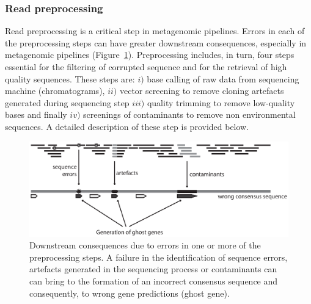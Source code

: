 \subsubsection{Read preprocessing}
Read preprocessing is a critical step in metagenomic pipelines. Errors in each of the preprocessing steps can have greater downstream consequences, especially in metagenomic pipelines (Figure~\ref{fig:errors}). Preprocessing includes, in turn, four steps essential for the filtering of corrupted sequence and for the retrieval of high quality sequences. These steps are: $i)$ base calling of raw data from sequencing machine (chromatograms), $ii)$ vector screening to remove cloning artefacts generated during sequencing step $iii)$ quality trimming to remove low-quality bases and finally $iv)$ screenings of contaminants to remove non environmental sequences. A detailed description of these step is provided below.\\%
\begin{figure}[!tb]
	\centering
	\includegraphics[width=1\textwidth]{./figures/Introduction/errors}
  	\caption{Downstream consequences due to errors in one or more of the preprocessing steps. A failure in the identification of sequence errors, artefacts generated in the sequencing process or contaminants can can bring to the formation of an incorrect consensus sequence and consequently, to wrong gene predictions (ghost gene). \label{fig:errors}}
\end{figure}%

